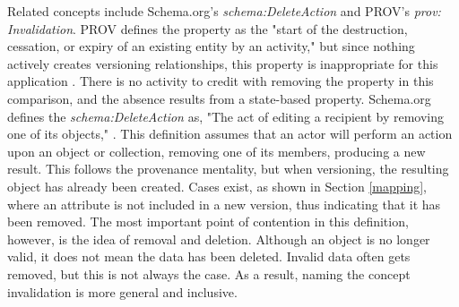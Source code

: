 Related concepts include Schema.org's \textit{schema:DeleteAction} and PROV's \textit{prov: Invalidation}.
PROV defines the property as the "start of the destruction, cessation, or expiry of an existing entity by an activity," but since nothing actively creates versioning relationships, this property is inappropriate for this application \cite{Lebo2013}.
There is no activity to credit with removing the property in this comparison, and the absence results from a state-based property.
Schema.org defines the \textit{schema:DeleteAction} as, "The act of editing a recipient by removing one of its objects," \cite{SchemaRem}.
This definition assumes that an actor will perform an action upon an object or collection, removing one of its members, producing a new result.
This follows the provenance mentality, but when versioning, the resulting object has already been created.
Cases exist, as shown in Section \ref{mapping}, where an attribute is not included in a new version, thus indicating that it has been removed.
The most important point of contention in this definition, however, is the idea of removal and deletion.
Although an object is no longer valid, it does not mean the data has been deleted.
Invalid data often gets removed, but this is not always the case.
As a result, naming the concept invalidation is more general and inclusive.
